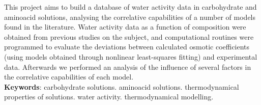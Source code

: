 \documentclass[
	12pt,				%
	openright,
	twoside,
	a4paper,			%
	brazil,			%
	french,				%
	spanish,			%
	english				%
	]{abntex2}
\begin{document}

\frenchspacing

\imprimircapa

\imprimirfolhaderosto


\setlength{\absparsep}{18pt}
\begin{resumo}
	This project aims to build a database of water activity data in
	carbohydrate and aminoacid solutions, analysing the correlative
	capabilities of a number of models found in the literature. Water
	activity data as a function of composition were obtained from previous
	studies on the subject, and computational routines were programmed
	to evaluate the deviations between calculated osmotic coefficients
	(using models obtained through nonlinear least-squares fitting) and
	experimental data. Afterwards we performed an analysis of the influence
	of several factors in the correlative capabilities of each model.\\
	\textbf{Keywords}: carbohydrate solutions.
			aminoacid solutions.
			thermodynamical properties of solutions.
			water activity.
			thermodynamical modelling.
\end{resumo}

\listoffigures*
\cleardoublepage


\listoftables*
\cleardoublepage
\end{document}

